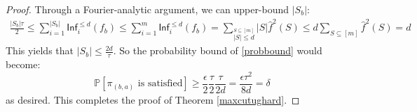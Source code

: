 \begin{proof}
Through a Fourier-analytic argument, we can upper-bound $|S_b|$:
\begin{align*}
  \frac{|S_b|\tau}{2} \leq \sum_{i = 1}^{|S_b|} \mathsf{Inf}_i^{\leq d}(f_b) \leq \sum_{i = 1}^m \mathsf{Inf}_i^{\leq d}(f_b) = \sum_{\overset{S \subseteq [m]}{|S| \leq d}} |S| \hat{f}^2(S) \leq d \sum_{S \subseteq [m]}  \hat{f}^2(S) = d
\end{align*}
This yields that $|S_b| \leq \frac{2d}{\tau}$. So the probability bound of \ref{probbound} would become:
%
\begin{equation}
  \mathbb{P}[\pi_{(b,a)} \text{ is satisfied}] \geq \frac{\epsilon}{2}\frac{\tau}{2}\frac{\tau}{2d} = \frac{\epsilon\tau^2}{8d} = \delta
\end{equation}
as desired. This completes the proof of Theorem \ref{maxcutughard}.

\end{proof}


